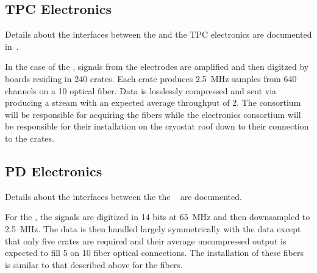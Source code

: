 
\subsection{TPC Electronics}
\label{sec:fd-daq-intfc-elec}

Details about the interfaces between the  and the 
 TPC electronics are documented in~\cite{bib:docdb6778}.

In the case of the  , signals from the
 electrodes are amplified and then digitzed by 
boards residing in 240  crates. 
Each crate produces \SI{2.5}{\MHz} samples from 640 channels on a
\SI{10}{\Gbps} optical fiber. 
Data is losslessly compressed and sent via  producing a
stream with an expected average throughput of \SI{2}{\Gbps}.
The  consortium will be responsible for acquiring the fibers while
the \dual electronics consortium will be responsible for their
installation on the cryostat roof down to their connection to the
 crates.


\subsection{PD Electronics}
\label{sec:fd-daq-intfc-photon}

Details about the interfaces between the  the 
~\cite{bib:docdb6802} are documented. 


For the  , the signals are digitized in 14 bits
at \SI{65}{\MHz} and then downsampled to \SI{2.5}{\MHz}. 
The data is then handled largely symmetrically with the 
data except that only five  crates are required and their
average uncompressed output is expected to fill \SI{5}{\Gbps} on
\SI{10}{\Gbps} fiber optical connections. 
The installation of these fibers is similar to that described above for the
 fibers.

